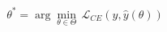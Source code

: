 \documentclass[preview]{standalone}
\begin{document}
\begin{align*}
\theta^* = \arg\min_{\theta \in \Theta}\,\mathcal{L}_{CE}(y,\hat y(\theta))
\end{align*}
\end{document}
